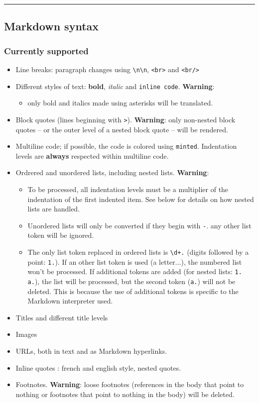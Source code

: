 \par\noindent\rule{\linewidth}{0.4pt}
\subsection{Markdown syntax}
\subsubsection{Currently supported}

\begin{itemize}
\item Line breaks: paragraph changes using \texttt{\textbackslash{}n\textbackslash{}n}, \texttt{<br\textgreater{}} and \texttt{<br/\textgreater{}}
\item Different styles of text: \textbf{bold}, \textit{italic} and \texttt{inline code}. \textbf{Warning}:
\begin{itemize} 
 \item only bold and italics made using asterisks will be translated.
\end{itemize}
\item Block quotes (lines beginning with \texttt{\textgreater{}}). \textbf{Warning}: only non-nested block quotes -- or the outer level of a nested block quote -- will be rendered.
\item Multiline code; if possible, the code is colored using \texttt{minted}. Indentation levels are \textbf{always} respected within multiline code.
\item Ordrered and unordered lists, including nested lists. \textbf{Warning}:
\begin{itemize} 
 \item To be processed, all indentation levels must be a multiplier of the indentation of the first indented item. See below for details on how nested lists are handled.
\item Unordered lists will only be converted if they begin with \texttt{-}. any other list token will be ignored.
\item The only list token replaced in ordered lists is \texttt{\textbackslash{}d+.} (digits followed by a point: \texttt{1.}). If an other list token is used (a letter...), the numbered list won't be processed. If additional tokens are added (for nested lists: \texttt{1. a.}), the list will be processed, but the second token (\texttt{a.}) will not be deleted. This is because the use of additional tokens is specific to the Markdown interpreter used.
\end{itemize}
\item Titles and different title levels
\item Images
\item URLs, both in text and as Markdown hyperlinks.
\item Inline quotes : french and english style, nested quotes.
\item Footnotes. \textbf{Warning}: loose footnotes (references in the body that point to nothing or footnotes that point to nothing in the body) will be deleted. 
\end{itemize}
